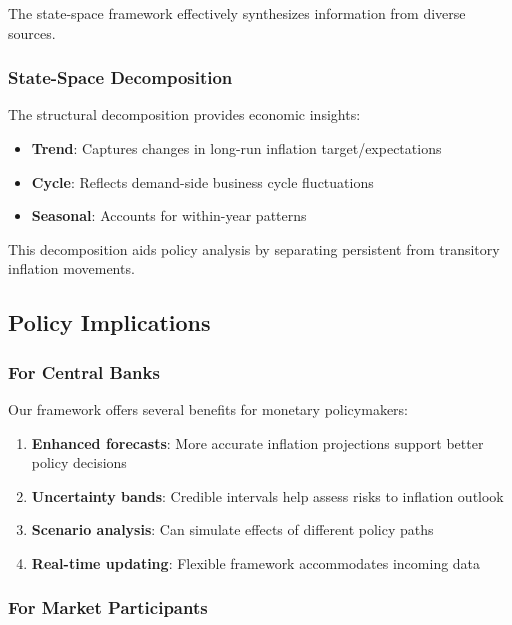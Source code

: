 The state-space framework effectively synthesizes information from diverse sources.

\subsubsection{State-Space Decomposition}

The structural decomposition provides economic insights:

\begin{itemize}
    \item \textbf{Trend}: Captures changes in long-run inflation target/expectations
    \item \textbf{Cycle}: Reflects demand-side business cycle fluctuations
    \item \textbf{Seasonal}: Accounts for within-year patterns
\end{itemize}

This decomposition aids policy analysis by separating persistent from transitory inflation movements.

\subsection{Policy Implications}

\subsubsection{For Central Banks}

Our framework offers several benefits for monetary policymakers:

\begin{enumerate}
    \item \textbf{Enhanced forecasts}: More accurate inflation projections support better policy decisions
    \item \textbf{Uncertainty bands}: Credible intervals help assess risks to inflation outlook
    \item \textbf{Scenario analysis}: Can simulate effects of different policy paths
    \item \textbf{Real-time updating}: Flexible framework accommodates incoming data
\end{enumerate}

\subsubsection{For Market Participants}

